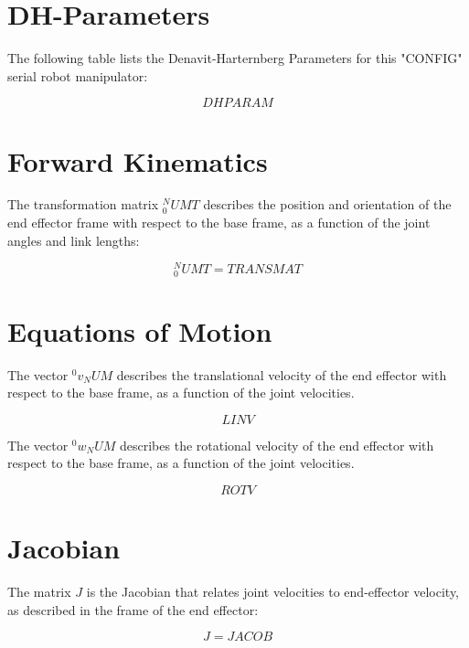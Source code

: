 \documentclass[12pt]{article}
\begin{document}
\maketitle

\section{DH-Parameters}\label{dh-parameters}
The following table lists the Denavit-Harternberg Parameters for this "CONFIG" serial robot manipulator:

\[
DHPARAM
\]

\section{Forward Kinematics}\label{forward kinematics}
The transformation matrix $ _0^NUMT $ describes the position and orientation of the end effector frame with respect to the base frame, as a function of the joint angles and link lengths:

\[
_0^NUMT =
TRANSMAT
\]

\section{Equations of Motion}\label{equations of motion}
The vector $ ^0v_NUM $ describes the translational velocity of the end effector with respect to the base frame, as a function of the joint velocities. 

\[
LINV
\]

The vector $ ^0w_NUM $ describes the rotational velocity of the end effector with respect to the base frame, as a function of the joint velocities. 

\[
ROTV
\]

\section{Jacobian}\label{Jacobian}
The matrix $ J $ is the Jacobian that relates joint velocities to end-effector velocity, as described in the frame of the end effector:

\[
J = 
JACOB
\]
\end{document}
